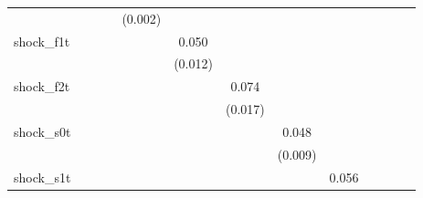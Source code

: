 {\begin{tabular}{l*{12}{c}}
            &                     &                     &                     &     (0.002)         &                     &                     &                     &                     &                     &                     &                     &                     \\
\addlinespace
shock\_f1t   &                     &                     &                     &                     &       0.050\sym{***}&                     &                     &                     &                     &                     &                     &                     \\
            &                     &                     &                     &                     &     (0.012)         &                     &                     &                     &                     &                     &                     &                     \\
\addlinespace
shock\_f2t   &                     &                     &                     &                     &                     &       0.074\sym{***}&                     &                     &                     &                     &                     &                     \\
            &                     &                     &                     &                     &                     &     (0.017)         &                     &                     &                     &                     &                     &                     \\
\addlinespace
shock\_s0t   &                     &                     &                     &                     &                     &                     &       0.048\sym{***}&                     &                     &                     &                     &                     \\
            &                     &                     &                     &                     &                     &                     &     (0.009)         &                     &                     &                     &                     &                     \\
\addlinespace
shock\_s1t   &                     &                     &                     &                     &                     &                     &                     &       0.056\sym{***}&                     &                     &                     &                     \\

\end{tabular}}
